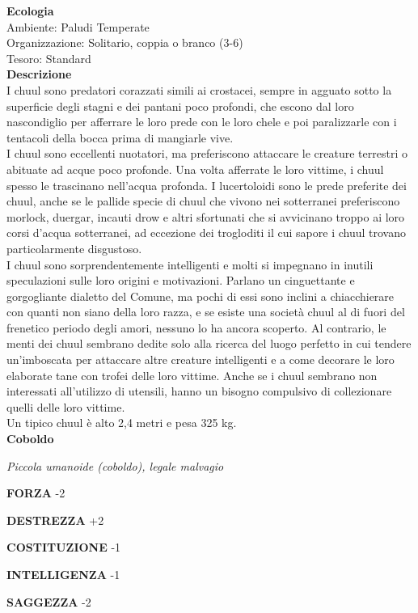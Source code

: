 \begin{multicols}{2}
\textbf{Ecologia}\\
Ambiente: Paludi Temperate\\
Organizzazione: Solitario, coppia o branco (3-6)\\
Tesoro: Standard\\
\textbf{Descrizione}\\
I chuul sono predatori corazzati simili ai crostacei, sempre in agguato sotto la superficie degli stagni e dei pantani poco profondi, che escono dal loro nascondiglio per afferrare le loro prede con le loro chele e poi paralizzarle con i tentacoli della bocca prima di mangiarle vive.\\
I chuul sono eccellenti nuotatori, ma preferiscono attaccare le creature terrestri o abituate ad acque poco profonde. Una volta afferrate le loro vittime, i chuul spesso le trascinano nell'acqua profonda. I lucertoloidi sono le prede preferite dei chuul, anche se le pallide specie di chuul che vivono nei sotterranei preferiscono morlock, duergar, incauti drow e altri sfortunati che si avvicinano troppo ai loro corsi d'acqua sotterranei, ad eccezione dei trogloditi il cui sapore i chuul trovano particolarmente disgustoso.\\
I chuul sono sorprendentemente intelligenti e molti si impegnano in inutili speculazioni sulle loro origini e motivazioni. Parlano un cinguettante e gorgogliante dialetto del Comune, ma pochi di essi sono inclini a chiacchierare con quanti non siano della loro razza, e se esiste una società chuul al di fuori del frenetico periodo degli amori, nessuno lo ha ancora scoperto. Al contrario, le menti dei chuul sembrano dedite solo alla ricerca del luogo perfetto in cui tendere un'imboscata per attaccare altre creature intelligenti e a come decorare le loro elaborate tane con trofei delle loro vittime. Anche se i chuul sembrano non interessati all'utilizzo di utensili, hanno un bisogno compulsivo di collezionare quelli delle loro vittime.\\
Un tipico chuul è alto 2,4 metri e pesa 325 kg.\\


\medskip{}\textbf{Coboldo}

\emph{Piccola umanoide (coboldo), legale malvagio}

\textbf{FORZA} -2

\textbf{DESTREZZA} +2

\textbf{COSTITUZIONE} -1

\textbf{INTELLIGENZA} -1

\textbf{SAGGEZZA} -2


\end{multicols}
